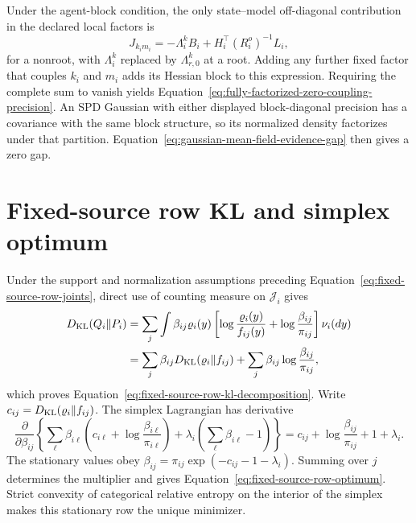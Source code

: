 Under the agent-block condition, the only state--model off-diagonal contribution in the declared local factors is
\begin{equation}
J_{k_i m_i}
=-\Lambda_i^kB_i
+H_i^\top(R_i^o)^{-1}L_i,
\label{eq:appendix-local-state-model-total}
\end{equation}
for a nonroot, with \(\Lambda_i^k\) replaced by \(\Lambda_{r,0}^k\) at a root. Adding any further fixed factor that couples \(k_i\) and \(m_i\) adds its Hessian block to this expression. Requiring the complete sum to vanish yields Equation~\eqref{eq:fully-factorized-zero-coupling-precision}. An SPD Gaussian with either displayed block-diagonal precision has a covariance with the same block structure, so its normalized density factorizes under that partition. Equation~\eqref{eq:gaussian-mean-field-evidence-gap} then gives a zero gap.

\section{Fixed-source row KL and simplex optimum}
\label{sec:fixed-source-row-proof}

Under the support and normalization assumptions preceding Equation~\eqref{eq:fixed-source-row-joints}, direct use of counting measure on \(\mathcal J_i\) gives
\begin{align}
D_{\mathrm{KL}}(Q_i\Vert P_i)
&=\sum_j\int\beta_{ij}\varrho_i(y)
\left[
\log\frac{\varrho_i(y)}{f_{ij}(y)}
+\log\frac{\beta_{ij}}{\pi_{ij}}
\right]\nu_i(dy)\notag\\
&=\sum_j\beta_{ij}D_{\mathrm{KL}}(\varrho_i\Vert f_{ij})
+\sum_j\beta_{ij}\log\frac{\beta_{ij}}{\pi_{ij}},
\label{eq:appendix-fixed-source-row-kl}
\end{align}
which proves Equation~\eqref{eq:fixed-source-row-kl-decomposition}. Write \(c_{ij}=D_{\mathrm{KL}}(\varrho_i\Vert f_{ij})\). The simplex Lagrangian has derivative
\begin{equation}
\frac{\partial}{\partial\beta_{ij}}
\left\{
\sum_\ell\beta_{i\ell}
\left(c_{i\ell}+\log\frac{\beta_{i\ell}}{\pi_{i\ell}}\right)
+\lambda_i\left(\sum_\ell\beta_{i\ell}-1\right)
\right\}
=c_{ij}+\log\frac{\beta_{ij}}{\pi_{ij}}+1+\lambda_i.
\label{eq:appendix-fixed-source-simplex-derivative}
\end{equation}
The stationary values obey \(\beta_{ij}=\pi_{ij}\exp(-c_{ij}-1-\lambda_i)\). Summing over \(j\) determines the multiplier and gives Equation~\eqref{eq:fixed-source-row-optimum}. Strict convexity of categorical relative entropy on the interior of the simplex makes this stationary row the unique minimizer.

